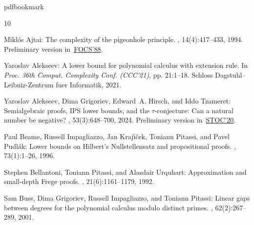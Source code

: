 \documentclass[11pt]{article}
\begin{document}
\newcommand{\prelim}{Preliminary version in\ }\newcommand{\prelims}{Preliminary
  versions in\ }
\providecommand{\bibhead}[1]{}
\expandafter\ifx\csname pdfbookmark\endcsname\relax%
  \providecommand{\tocrefpdfbookmark}{}
\else\providecommand{\tocrefpdfbookmark}{%
   \hypertarget{tocreferences}{}%
   \pdfbookmark[1]{References}{tocreferences}}%
\fi

\tocrefpdfbookmark
\begin{thebibliography}{10}

\bibhead{Ajt88}
{\sc Mikl\'{o}s Ajtai}: The complexity of the pigeonhole principle.
, 14(4):417--433, 1994.
\newblock \prelim \href{https://doi.org/10.1109/SFCS.1988.21951}{FOCS'88}.
\newblock [\epfmtdoi{10.1007/BF01302964}]

\bibhead{conf-version}
{\sc Yaroslav Alekseev}: A lower bound for polynomial calculus with extension
  rule.
\newblock In {\em Proc. 36th Comput. Complexity Conf. (CCC'21)}, pp. 21:1--18.
  Schloss Dagstuhl--Leibniz-Zentrum fuer Informatik, 2021.

\bibhead{AGHT19_new}
{\sc Yaroslav Alekseev, Dima Grigoriev, Edward~A. Hirsch, and Iddo Tzameret}:
  Semialgebraic proofs, {IPS} lower bounds, and the $\tau$-conjecture: {C}an a
  natural number be negative?
, 53(3):648--700, 2024.
\newblock \prelim \href{https://doi.org/10.1145/3357713.3384245}{STOC'20}.
\newblock [\epfmtdoi{10.1137/20M1374523}]

\bibhead{BeameIKPP96}
{\sc Paul Beame, Russell Impagliazzo, Jan Kraj{\'{\i}}{\v{c}}ek, Toniann
  Pitassi, and Pavel Pudl{\'a}k}: Lower bounds on {H}ilbert's {N}ullstellensatz
  and propositional proofs.
, 73(1):1--26, 1996.

\bibhead{doi:10.1137/0221068}
{\sc Stephen Bellantoni, Toniann Pitassi, and Alasdair Urquhart}: Approximation
  and small-depth {Frege} proofs.
, 21(6):1161--1179, 1992.
\newblock [\epfmtdoi{10.1137/0221068}]

\bibhead{BussGIP01}
{\sc Sam Buss, Dima Grigoriev, Russell Impagliazzo, and Toniann Pitassi}:
  Linear gaps between degrees for the polynomial calculus modulo distinct
  primes.
, 62(2):267--289, 2001.


\end{thebibliography}
\end{document}

